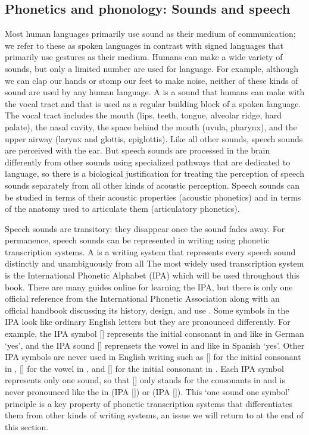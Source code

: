 \subsection{Phonetics and phonology: Sounds and speech}\label{sec:intro-ling-phon}

Most human languages primarily use sound as their medium of communication; we refer to these as spoken languages in contrast with signed languages that primarily use gestures as their medium.
Humans can make a wide variety of sounds, but only a limited number are used for language.
For example, although we can clap our hands or stomp our feet to make noise, neither of these kinds of sound are used by any human language.
A  is a sound that humans can make with the vocal tract and that is used as a regular building block of a spoken language.
The vocal tract includes the mouth (lips, teeth, tongue, alveolar ridge, hard palate), the nasal cavity, the space behind the mouth (uvula, pharynx), and the upper airway (larynx and glottis, epiglottis).
Like all other sounds, speech sounds are perceived with the ear.
But speech sounds are processed in the brain differently from other sounds using specialized pathways that are dedicated to language, so there is a biological justification for treating the perception of speech sounds separately from all other kinds of acoustic perception.
Speech sounds can be studied in terms of their acoustic properties (acoustic phonetics) and in terms of the anatomy used to articulate them (articulatory phonetics).

Speech sounds are transitory: they disappear once the sound fades away.
For permanence, speech sounds can be represented in writing using phonetic transcription systems.
A  is a writing system that represents every speech sound distinctly and unambiguously from all 
The most widely used transcription system is the International Phonetic Alphabet (IPA) which will be used throughout this book.
There are many guides online for learning the IPA, but there is only one official reference from the International Phonetic Association \parencite{international-phonetic-association:2018} along with an official handbook discussing its history, design, and use \parencite{international-phonetic-association:1999}.
Some symbols in the IPA look like ordinary English letters but they are pronounced differently.
For example, the IPA symbol [] represents the initial consonant in  and  like in German  ‘yes’, and the IPA sound [] reprensets the vowel in  and  like in Spanish  ‘yes’.
Other IPA symbols are never used in English writing such as [] for the initial consonant in , [] for the vowel in , and [] for the initial consonant in .
Each IPA symbol represents only one sound, so that [] only stands for the consonants in  and is never pronounced like the  in  (IPA []) or  (IPA []).
This ‘one sound one symbol’ principle is a key property of phonetic transcription systems that differentiates them from other kinds of writing systems, an issue we will return to at the end of this section.

